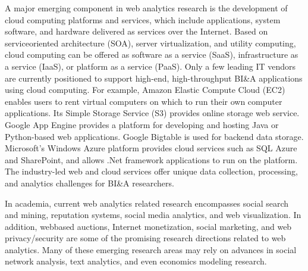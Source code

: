 A major emerging component in web analytics research is the
development of cloud computing platforms and services,
which include applications, system software, and hardware
delivered as services over the Internet. Based on serviceoriented
architecture (SOA), server virtualization, and utility
computing, cloud computing can be offered as software as a service (SaaS), infrastructure as a service (IaaS), or platform
as a service (PaaS). Only a few leading IT vendors are currently
positioned to support high-end, high-throughput BI\&A
applications using cloud computing. For example, Amazon
Elastic Compute Cloud (EC2) enables users to rent virtual
computers on which to run their own computer applications.
Its Simple Storage Service (S3) provides online storage web
service. Google App Engine provides a platform for developing
and hosting Java or Python-based web applications.
Google Bigtable is used for backend data storage. Microsoft’s
Windows Azure platform provides cloud services such as
SQL Azure and SharePoint, and allows .Net framework
applications to run on the platform. The industry-led web and
cloud services offer unique data collection, processing, and
analytics challenges for BI\&A researchers.

In academia, current web analytics related research encompasses
social search and mining, reputation systems, social
media analytics, and web visualization. In addition, webbased
auctions, Internet monetization, social marketing, and
web privacy/security are some of the promising research
directions related to web analytics. Many of these emerging
research areas may rely on advances in social network analysis,
text analytics, and even economics modeling research.
